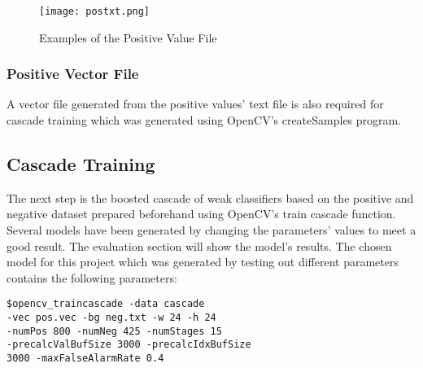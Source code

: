             \begin{figure}[H]
                \centering
                \texttt{[image: postxt.png]}
                \caption{Examples of the Positive Value File}
                \label{postxt}
            \end{figure}

        \subsubsection{Positive Vector File}
            A vector file generated from the positive values' text file is
            also required for cascade training which was generated using
            OpenCV's createSamples program.

    \subsection{Cascade Training}
        The next step is the boosted cascade of weak classifiers based
        on the positive and negative dataset prepared beforehand using
        OpenCV's train cascade function. Several models have been
        generated by changing the parameters' values to meet a good
        result. The evaluation section will show the model's results.
        The chosen model for this project which was generated by testing
        out different parameters contains the following parameters: 

            \begin{verbatim}
$opencv_traincascade -data cascade 
-vec pos.vec -bg neg.txt -w 24 -h 24 
-numPos 800 -numNeg 425 -numStages 15
-precalcValBufSize 3000 -precalcIdxBufSize 
3000 -maxFalseAlarmRate 0.4
            \end{verbatim}

